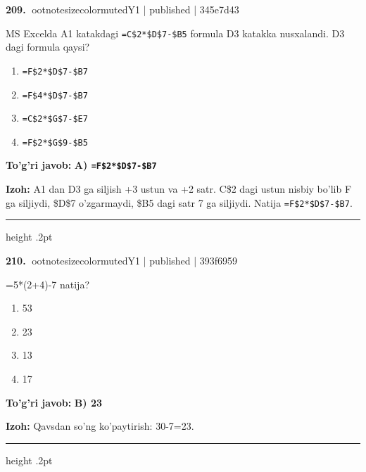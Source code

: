 \documentclass[10pt,a4paper]{article}
\begin{document}
\textbf{\color{ink}209.} {ootnotesizecolor{muted}Y1 | published | 345e7d43}
\par
MS Excelda A1 katakdagi \texttt{=C\$2*\$D\$7-\$B5} formula D3 katakka nusxalandi. D3 dagi formula qaysi?
\begin{enumerate}[label=\Alph*),leftmargin=9mm]
\item \texttt{=F\$2*\$D\$7-\$B7}
\item \texttt{=F\$4*\$D\$7-\$B7}
\item \texttt{=C\$2*\$G\$7-\$E7}
\item \texttt{=F\$2*\$G\$9-\$B5}
\end{enumerate}
\begin{tcolorbox}[enhanced,breakable,colback=teal!4,colframe=teal!55!black,boxrule=0.45pt,arc=1.2mm,left=2.8mm,right=2.8mm,top=2mm,bottom=2mm]
\textbf{\color{teal}To'g'ri javob:} \textbf{A) \texttt{=F\$2*\$D\$7-\$B7}}
\par\smallskip
\textbf{Izoh:} A1 dan D3 ga siljish +3 ustun va +2 satr. C\$2 dagi ustun nisbiy bo'lib F ga siljiydi, \$D\$7 o'zgarmaydi, \$B5 dagi satr 7 ga siljiydi. Natija \texttt{=F\$2*\$D\$7-\$B7}.
\end{tcolorbox}
\vspace{2mm}\hrule height .2pt\vspace{2mm}

\textbf{\color{ink}210.} {ootnotesizecolor{muted}Y1 | published | 393f6959}
\par
=5*(2+4)-7 natija?
\begin{enumerate}[label=\Alph*),leftmargin=9mm]
\item 53
\item 23
\item 13
\item 17
\end{enumerate}
\begin{tcolorbox}[enhanced,breakable,colback=teal!4,colframe=teal!55!black,boxrule=0.45pt,arc=1.2mm,left=2.8mm,right=2.8mm,top=2mm,bottom=2mm]
\textbf{\color{teal}To'g'ri javob:} \textbf{B) 23}
\par\smallskip
\textbf{Izoh:} Qavsdan so'ng ko'paytirish: 30-7=23.
\end{tcolorbox}
\vspace{2mm}\hrule height .2pt\vspace{2mm}
\end{document}
